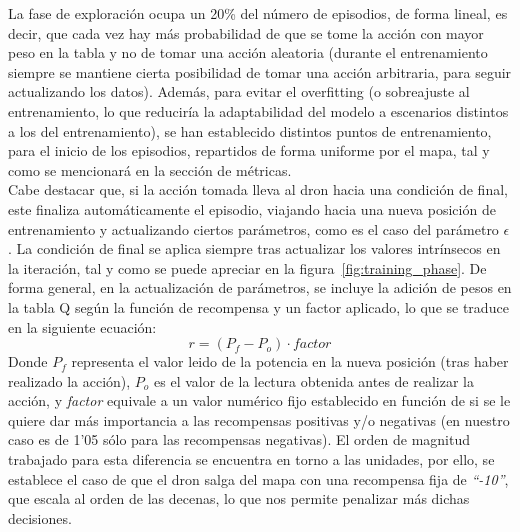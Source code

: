 La fase de exploración ocupa un 20\% del número de episodios, de forma lineal, es decir, que cada vez hay más probabilidad de que se tome la acción con mayor peso en la tabla y no de tomar una acción aleatoria (durante el entrenamiento siempre se mantiene cierta posibilidad de tomar una acción arbitraria, para seguir actualizando los datos). Además, para evitar el overfitting (o sobreajuste al entrenamiento, lo que reduciría la adaptabilidad del modelo a escenarios distintos a los del entrenamiento), se han establecido distintos puntos de entrenamiento, para el inicio de los episodios, repartidos de forma uniforme por el mapa, tal y como se mencionará en la sección de métricas.\\


Cabe destacar que, si la acción tomada lleva al dron hacia una condición de final, este finaliza automáticamente el episodio, viajando hacia una nueva posición de entrenamiento y actualizando ciertos parámetros, como es el caso  del parámetro $\epsilon$. La condición de final se aplica siempre tras actualizar los valores intrínsecos en la iteración, tal y como se puede apreciar en la figura~\ref{fig:training_phase}. De forma general, en la actualización de parámetros, se incluye la adición de pesos en la tabla Q según la función de recompensa y un factor aplicado, lo que se traduce en la siguiente ecuación:
\begin{equation}
    r = (P_f - P_o) \cdot factor
\end{equation}
Donde $P_f$ representa el valor leido de la potencia en la nueva posición (tras haber realizado la acción), $P_o$ es el valor de la lectura obtenida antes de realizar la acción, y \emph{factor} equivale a un valor numérico fijo establecido en función de si se le quiere dar más importancia a las recompensas positivas y/o negativas (en nuestro caso es de 1'05 sólo para las recompensas negativas). El orden de magnitud trabajado para esta diferencia se encuentra en torno a las unidades, por ello, se establece el caso de que el dron salga del mapa con una recompensa fija de \emph{``-10''}, que escala al orden de las decenas, lo que nos permite penalizar más dichas decisiones.\\

